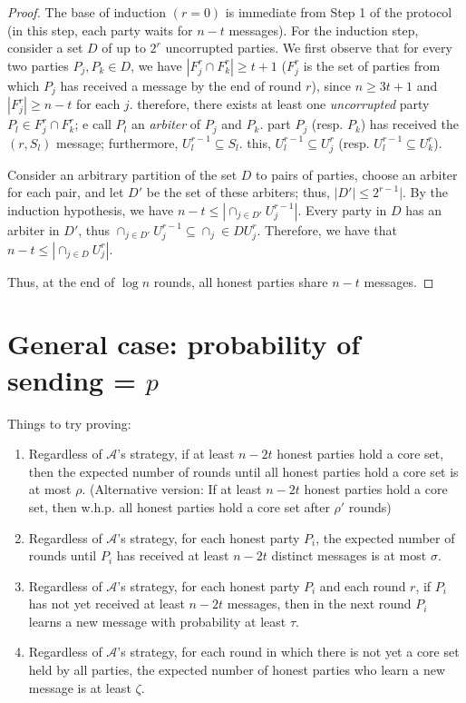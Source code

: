 \documentclass{article}
\newcommand{\A}{\mathcal{A}}
\begin{document}
\begin{proof}
The base of induction $(r=0)$ is immediate from Step 1 of the protocol (in this step, each party waits for $n-t$ messages). For the induction step, consider a set $D$ of up to $2^r$ uncorrupted parties. We first observe that for every two parties $P_j,P_k \in D$, we have $|F_j^r \cap F_k^r| \geq t + 1$ ($F_j^r$ is the set of parties from which $P_j$ has received a message by the end of round $r$), since $n \geq 3t +1$ and $|F_j^r| \geq n - t$ for each $j$. therefore, there exists at least one \emph{uncorrupted} party $P_l \in F_j^r \cap F_k^r$; e call $P_l$ an \emph{arbiter} of $P_j$ and $P_k$. part $P_j$ (resp. $P_k$) has received the $(r, S_l)$ message; furthermore, $U^{r-1}_l \subseteq S_l$. this, $U_l^{r-1} \subseteq U_j^r$ (resp. $U_l^{r-1} \subseteq U_k^r$).

Consider an arbitrary partition of the set $D$ to pairs of parties, choose an arbiter for each pair, and let $D'$ be the set of these arbiters; thus, $|D'| \leq 2^{r-1}|$. By the induction hypothesis, we have $n - t \leq |\cap_{j\in D'} U_j^{r-1}|$. Every party in $D$ has an arbiter in $D'$, thus $\cap_{j \in D'} U_j^{r-1} \subseteq \cap_j \in D U_j^r$. Therefore, we have that $n - t \leq |\cap_{j\in D} U_j^{r}|$.

Thus, at the end of $\log n$ rounds, all honest parties share $n - t$ messages.
\end{proof}



\section{General case: probability of sending = $p$}

Things to try proving:
\begin{enumerate}
    \item  Regardless of $\A$'s strategy, if at least $n-2t$ honest parties hold a core set, then the expected number of rounds until all honest parties hold a core set is at most $\rho$. (Alternative version:
    If at least $n-2t$ honest parties hold a core set, then w.h.p. all honest parties hold a core set after $\rho'$ rounds)
    \item Regardless of $\A$'s strategy, for each honest party $P_i$, the expected number of rounds until $P_i$ has received at least $n-2t$ distinct messages is at most $\sigma$.
    \item Regardless of $\A$'s strategy, for each honest party $P_i$ and each round $r$, if $P_i$ has not yet received at least $n-2t$ messages, then in the next round $P_i$ learns a new message with probability at least $\tau$.
    \item Regardless of $\A$'s strategy, for each round in which there is not yet a core set held by all parties, the expected number of honest parties who learn a new message is at least $\zeta$.
\end{enumerate}
\end{document}
